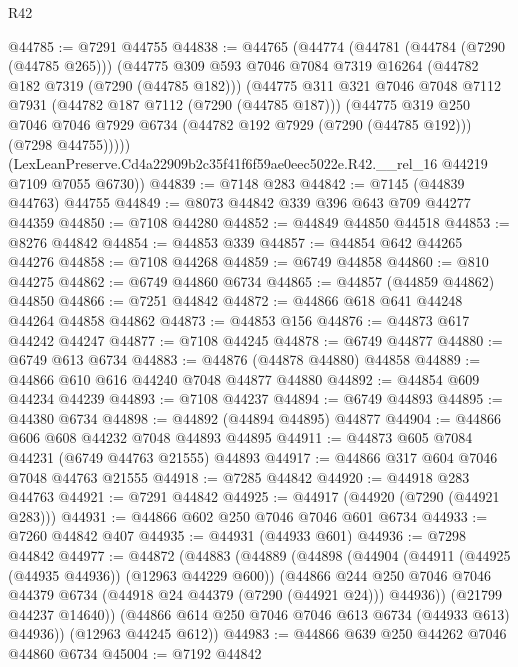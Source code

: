 \begin{lexlean}{R42}
\begin{coremodule}
{@44785 := @7291 @44755
@44838 := @44765
    (@44774
      (@44781
        (@44784 (@7290 (@44785 @265)))
        (@44775
          @309
          @593
          @7046
          @7084
          @7319
          @16264
          (@44782 @182 @7319 (@7290 (@44785 @182)))
          (@44775
            @311
            @321
            @7046
            @7048
            @7112
            @7931
            (@44782 @187 @7112 (@7290 (@44785 @187)))
            (@44775
              @319
              @250
              @7046
              @7046
              @7929
              @6734
              (@44782 @192 @7929 (@7290 (@44785 @192)))
              (@7298 @44755)))))
      (LexLeanPreserve.Cd4a22909b2c35f41f6f59ae0eec5022e.R42.__rel_16 @44219 @7109 @7055 @6730))
@44839 := @7148 @283
@44842 := @7145 (@44839 @44763) @44755
@44849 := @8073 @44842 @339 @396 @643 @709 @44277 @44359
@44850 := @7108 @44280
@44852 := @44849 @44850 @44518
@44853 := @8276 @44842
@44854 := @44853 @339
@44857 := @44854 @642 @44265 @44276
@44858 := @7108 @44268
@44859 := @6749 @44858
@44860 := @810 @44275
@44862 := @6749 @44860 @6734
@44865 := @44857 (@44859 @44862) @44850
@44866 := @7251 @44842
@44872 := @44866 @618 @641 @44248 @44264 @44858 @44862
@44873 := @44853 @156
@44876 := @44873 @617 @44242 @44247
@44877 := @7108 @44245
@44878 := @6749 @44877
@44880 := @6749 @613 @6734
@44883 := @44876 (@44878 @44880) @44858
@44889 := @44866 @610 @616 @44240 @7048 @44877 @44880
@44892 := @44854 @609 @44234 @44239
@44893 := @7108 @44237
@44894 := @6749 @44893
@44895 := @44380 @6734
@44898 := @44892 (@44894 @44895) @44877
@44904 := @44866 @606 @608 @44232 @7048 @44893 @44895
@44911 := @44873 @605 @7084 @44231 (@6749 @44763 @21555) @44893
@44917 := @44866 @317 @604 @7046 @7048 @44763 @21555
@44918 := @7285 @44842
@44920 := @44918 @283 @44763
@44921 := @7291 @44842
@44925 := @44917 (@44920 (@7290 (@44921 @283)))
@44931 := @44866 @602 @250 @7046 @7046 @601 @6734
@44933 := @7260 @44842 @407
@44935 := @44931 (@44933 @601)
@44936 := @7298 @44842
@44977 := @44872
    (@44883
      (@44889
        (@44898
          (@44904
            (@44911 (@44925 (@44935 @44936)) (@12963 @44229 @600))
            (@44866
              @244
              @250
              @7046
              @7046
              @44379
              @6734
              (@44918 @24 @44379 (@7290 (@44921 @24)))
              @44936))
          (@21799 @44237 @14640))
        (@44866 @614 @250 @7046 @7046 @613 @6734 (@44933 @613) @44936))
      (@12963 @44245 @612))
@44983 := @44866 @639 @250 @44262 @7046 @44860 @6734
@45004 := @7192
    @44842
}
\end{coremodule}
\end{lexlean}
